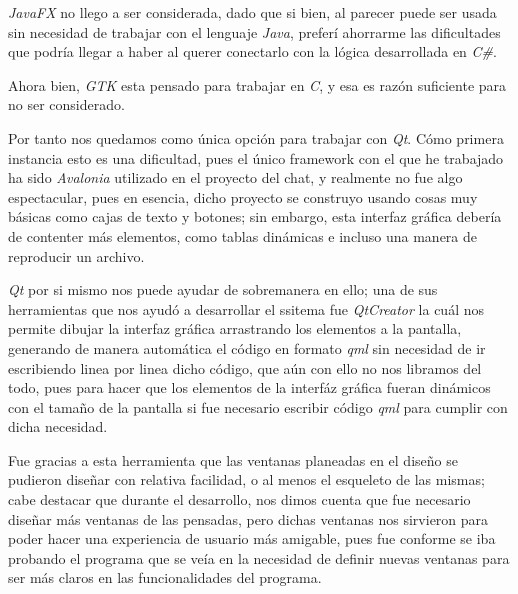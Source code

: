 \documentclass[10pt,letterpaper]{report}
\begin{document}
    \vspace{0.2cm}
    
    \noindent \textit{JavaFX} no llego a ser considerada, dado que si bien, al parecer puede ser usada sin necesidad de trabajar con el lenguaje \textit{Java}, preferí ahorrarme las dificultades que podría llegar a haber al querer conectarlo con la lógica desarrollada en \textit{C\#}.

    \vspace{0.2cm}

    \noindent Ahora bien, \textit{GTK} esta pensado para trabajar en \textit{C}, y esa es razón suficiente para no ser considerado.
    
    \vspace{0.2cm}

    \noindent Por tanto nos quedamos como única opción para trabajar con \textit{Qt}. Cómo primera instancia esto es una dificultad, pues el único framework con el que he trabajado ha sido \textit{Avalonia} utilizado en el proyecto del chat, y realmente no fue algo espectacular, pues en esencia, dicho proyecto se construyo usando cosas muy básicas como cajas de texto y botones; sin embargo, esta interfaz gráfica debería de contenter más elementos, como tablas dinámicas e incluso una manera de reproducir un archivo.

    \noindent \textit{Qt} por si mismo nos puede ayudar de sobremanera en ello; una de sus herramientas que nos ayudó a desarrollar el ssitema fue \textit{QtCreator} la cuál nos permite dibujar la interfaz gráfica arrastrando los elementos a la pantalla, generando de manera automática el código en formato \textit{qml} sin necesidad de ir escribiendo linea por linea dicho código, que aún con ello no nos libramos del todo, pues para hacer que los elementos de la interfáz gráfica fueran dinámicos con el tamaño de la pantalla si fue necesario escribir código \textit{qml} para cumplir con dicha necesidad.

    \vspace{0.2 cm}
    
    \noindent Fue gracias a esta herramienta que las ventanas planeadas en el diseño se pudieron diseñar con relativa facilidad, o al menos el esqueleto de las mismas; cabe destacar que durante el desarrollo, nos dimos cuenta que fue necesario diseñar más ventanas de las pensadas, pero dichas ventanas nos sirvieron para poder hacer una experiencia de usuario más amigable, pues fue conforme se iba probando el programa que se veía en la necesidad de definir nuevas ventanas para ser más claros en las funcionalidades del programa.
\end{document}
